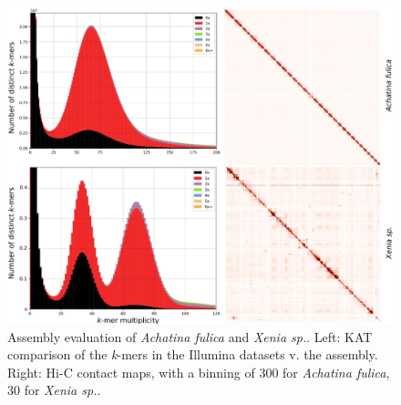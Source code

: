 \begin{figure}
    \centering
    \includegraphics[width=\textwidth]{fig/review_assembly_evaluation.eps}
    \caption{Assembly evaluation of \textit{Achatina fulica} and \textit{Xenia sp.}. Left: KAT comparison of the \textit{k}-mers in the Illumina datasets v. the assembly. Right: Hi-C contact maps, with a binning of 300 for \textit{Achatina fulica}, 30 for \textit{Xenia sp.}.}
    \label{fig:evaluation}
\end{figure}

